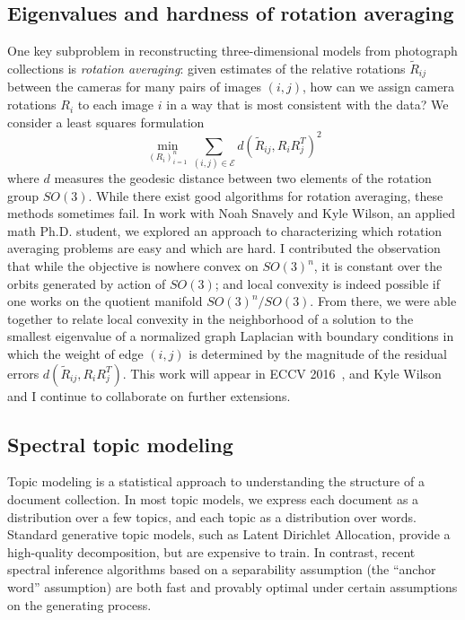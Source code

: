 \documentclass{amsart}
\begin{document}
\subsection*{Eigenvalues and hardness of rotation averaging}

One key subproblem in reconstructing three-dimensional models from
photograph collections is {\em rotation averaging}: given estimates of
the relative rotations $\tilde{R}_{ij}$ between the cameras for many
pairs of images $(i,j)$, how can we assign camera rotations $R_i$ to
each image $i$ in a way that is most consistent with the data?  We
consider a least squares formulation
\[
  \min_{(R_i)_{i=1}^n} \sum_{(i,j)
  \in \mathcal{E}} d(\tilde{R}_{ij}, R_i R_j^T)^2
\]
where $d$ measures the geodesic distance between two elements of
the rotation group $SO(3)$.  While there exist good algorithms for
rotation averaging, these methods sometimes fail.  In work with
Noah Snavely and Kyle Wilson, an applied math Ph.D. student,
we explored an approach to characterizing which rotation averaging
problems are easy and which are hard.
%
I contributed the observation that while the objective is nowhere convex
on $SO(3)^n$, it is constant over the orbits generated by action of
$SO(3)$; and local convexity is indeed possible if one works on the
quotient manifold $SO(3)^n/SO(3)$. From there, we were able together to
relate local convexity in the neighborhood of a solution to the smallest
eigenvalue of a normalized graph Laplacian with boundary conditions in
which the weight of edge $(i,j)$ is determined by the magnitude of the
residual errors $d(\tilde{R}_{ij}, R_i R_j^T)$.  This work will appear
in ECCV 2016~\cite{2016-rotations}, and Kyle Wilson and I continue to
collaborate on further extensions.


\subsection*{Spectral topic modeling}

Topic modeling is a statistical approach to understanding the
structure of a document collection.  In most topic models,
we express each document as a distribution over a few topics,
and each topic as a distribution over words.
Standard generative topic models, such as Latent Dirichlet Allocation,
provide a high-quality decomposition, but are expensive to train.
In contrast, recent spectral inference algorithms based on
a separability assumption (the ``anchor
word'' assumption) are both fast and provably optimal under certain
assumptions on the generating process.
\end{document}
